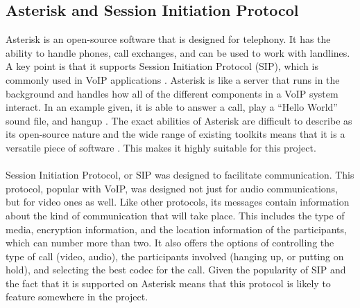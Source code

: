 \documentclass[main.tex]{subfiles}
\begin{document}
\subsection{Asterisk and Session Initiation Protocol}
Asterisk is an open-source software that is designed for telephony. It has the ability to handle phones, call exchanges, and can be used to work with landlines. A key point is that it supports Session Initiation Protocol (SIP), which is commonly used in VoIP applications \cite{asterisk-story}. Asterisk is like a server that runs in the background and handles how all of the different components in a VoIP system interact. In an example given, it is able to answer a call, play a ``Hello World'' sound file, and hangup \cite{asterisk-more}. The exact abilities of Asterisk are difficult to describe as its open-source nature and the wide range of existing toolkits means that it is a versatile piece of software \cite{asterisk-story}. This makes it highly suitable for this project.
\\\\
Session Initiation Protocol, or SIP was designed to facilitate communication. This protocol, popular with VoIP, was designed not just for audio communications, but for video ones as well. Like other protocols, its messages contain information about the kind of communication that will take place. This includes the type of media, encryption information, and the location information of the participants, which can number more than two. It also offers the options of controlling the type of call (video, audio), the participants involved (hanging up, or putting on hold), and selecting the best codec for the call. Given the popularity of SIP and the fact that it is supported on Asterisk means that this protocol is likely to feature somewhere in the project. \cite{sip}
\end{document}
